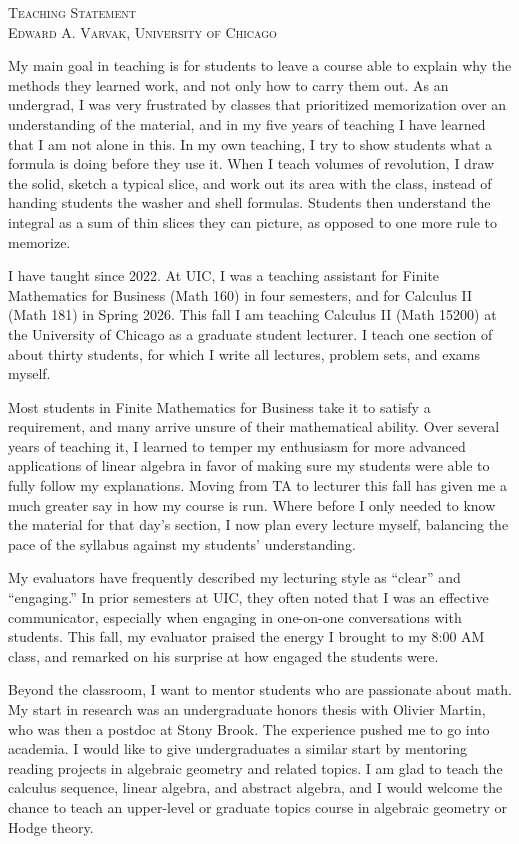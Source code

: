 \documentclass[12pt]{amsart}
\begin{document}
\begin{center}
  {\large\textsc{Teaching Statement}}\\[5pt]
  \small\textsc{Edward A. Varvak, University of Chicago}
\end{center}

My main goal in teaching is for students to leave a course able to explain why
the methods they learned work, and not only how to carry them out. As an undergrad, 
I was very frustrated by classes that prioritized memorization over an understanding 
of the material, and in my five years of teaching I have learned that I am not alone 
in this. In my own teaching, I try to show students what a formula is doing before
they use it. When I teach volumes of revolution, I draw the solid, sketch a typical
slice, and work out its area with the class, instead of handing students the washer
and shell formulas. Students then understand the integral as a sum of thin slices 
they can picture, as opposed to one more rule to memorize.


I have taught since 2022. At UIC, I was a teaching assistant for 
Finite Mathematics for Business (Math 160) in four semesters, and for
Calculus II (Math 181) in Spring 2026. This fall I am teaching Calculus II
(Math 15200) at the University of Chicago as a graduate student lecturer.
I teach one section of about thirty students, for which I write all lectures, 
problem sets, and exams myself. 

Most students in Finite Mathematics for Business take it to satisfy a requirement,
and many arrive unsure of their mathematical ability. Over several years of teaching it, 
I learned to temper my enthusiasm for more advanced applications of linear algebra
in favor of making sure my students were able to fully follow my explanations. 
Moving from TA to lecturer this fall has given me a much greater say in how my course 
is run. Where before I only needed to know the material for that day's section, 
I now plan every lecture myself, balancing the pace of the syllabus against 
my students' understanding.

My evaluators have frequently described my lecturing style as ``clear'' and ``engaging.''
In prior semesters at UIC, they often noted that 
I was an effective communicator, especially when engaging in one-on-one 
conversations with students. This fall, my evaluator praised 
the energy I brought to my 8:00 AM class, and remarked on his surprise at how engaged 
the students were. 


Beyond the classroom, I want to mentor students who are passionate about math.
My start in research was an undergraduate honors thesis with Olivier Martin, who 
was then a postdoc at Stony Brook. The experience pushed me to go into academia.
I would like to give undergraduates a similar start by mentoring reading projects 
in algebraic geometry and related topics. I am glad to teach the calculus sequence, 
linear algebra, and abstract algebra, and I would welcome the chance to teach an 
upper-level or graduate topics course in algebraic geometry or Hodge theory.
\end{document}
